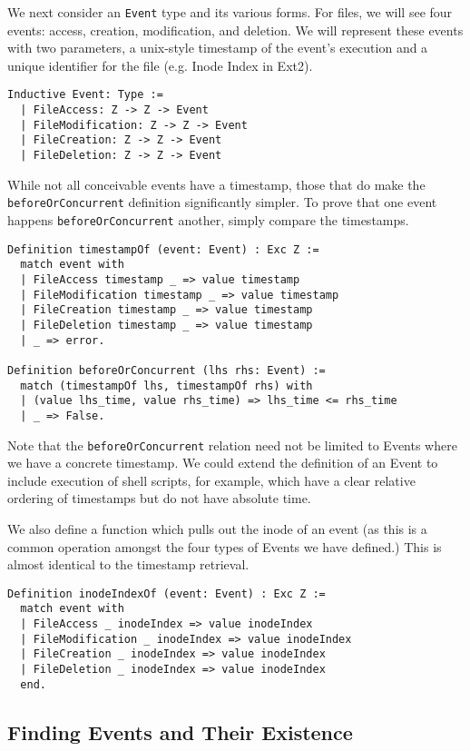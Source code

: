 \documentclass[nocopyrightspace]{sigplanconf}
\begin{document}
We next consider an {\tt Event} type and its various forms. For files, we will
see four events: access, creation, modification, and deletion. We will
represent these events with two parameters, a unix-style timestamp of the
event's execution and a unique identifier for the file (e.g. Inode Index in
Ext2).

\begin{lstlisting}
Inductive Event: Type :=
  | FileAccess: Z -> Z -> Event
  | FileModification: Z -> Z -> Event
  | FileCreation: Z -> Z -> Event
  | FileDeletion: Z -> Z -> Event
\end{lstlisting}

While not all conceivable events have a timestamp, those that do make the {\tt
beforeOrConcurrent} definition significantly simpler. To prove that one event
happens {\tt beforeOrConcurrent} another, simply compare the timestamps.

\begin{lstlisting}
Definition timestampOf (event: Event) : Exc Z :=
  match event with
  | FileAccess timestamp _ => value timestamp
  | FileModification timestamp _ => value timestamp
  | FileCreation timestamp _ => value timestamp
  | FileDeletion timestamp _ => value timestamp
  | _ => error.

Definition beforeOrConcurrent (lhs rhs: Event) :=
  match (timestampOf lhs, timestampOf rhs) with
  | (value lhs_time, value rhs_time) => lhs_time <= rhs_time
  | _ => False.
\end{lstlisting}

Note that the {\tt beforeOrConcurrent} relation need not be limited to Events
where we have a concrete timestamp. We could extend the definition of an Event
to include execution of shell scripts, for example, which have a clear
relative ordering of timestamps but do not have absolute time.

We also define a function which pulls out the inode of an event (as this is a
common operation amongst the four types of Events we have defined.) This is
almost identical to the timestamp retrieval. 

\begin{lstlisting}
Definition inodeIndexOf (event: Event) : Exc Z :=
  match event with
  | FileAccess _ inodeIndex => value inodeIndex
  | FileModification _ inodeIndex => value inodeIndex
  | FileCreation _ inodeIndex => value inodeIndex
  | FileDeletion _ inodeIndex => value inodeIndex
  end.
\end{lstlisting}

\subsection{Finding Events and Their Existence}
\end{document}
